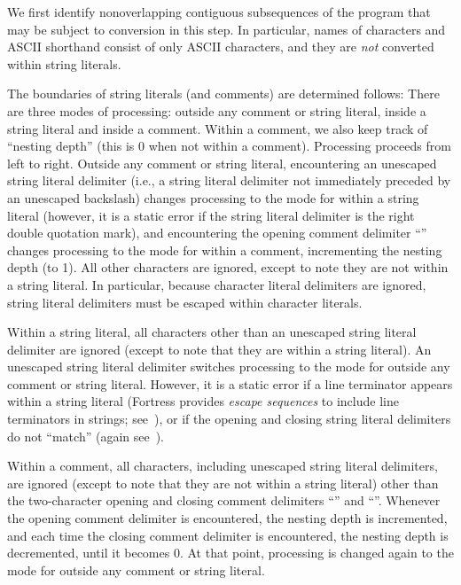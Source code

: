 We first identify nonoverlapping contiguous subsequences
of the program
that may be subject to conversion in this step.
In particular,
names of characters and ASCII shorthand consist of
only ASCII characters,
and they are \emph{not} converted within string literals.

The boundaries of string literals (and comments)
are determined follows:
There are three modes of processing:
outside any comment or string literal,
inside a string literal
and inside a comment.
Within a comment,
we also keep track of ``nesting depth''
(this is 0 when not within a comment).
Processing proceeds from left to right.
Outside any comment or string literal,
encountering an unescaped string literal delimiter
(i.e., a string literal delimiter not immediately
preceded by an unescaped backslash)
changes processing to the mode for within a string literal
(however, it is a static error if the string literal delimiter
is the right double quotation mark),
and encountering
the opening comment delimiter ``\txt{(*}''
changes processing to the mode for within a comment,
incrementing the nesting depth (to 1).
All other characters are ignored,
except to note they are not within a string literal.
In particular,
because character literal delimiters are ignored,
string literal delimiters must be escaped within
character literals.

Within a string literal,
all characters other than an unescaped string literal delimiter
are ignored
(except to note that they are within a string literal).
An unescaped string literal delimiter switches processing
to the mode for outside any comment or string literal.
However,
it is a static error if a line terminator appears
within a string literal
(Fortress provides \emph{escape sequences}
to include line terminators in strings;
see~),
or if the opening and closing string literal delimiters
do not ``match''
(again see~).

Within a comment,
all characters, including unescaped string literal delimiters, are ignored
(except to note that they are not within a string literal)
other than the two-character opening and closing comment delimiters
``\txt{(*}'' and ``\txt{*)}''.
Whenever the opening comment delimiter is encountered,
the nesting depth is incremented,
and each time the closing comment delimiter is encountered,
the nesting depth is decremented,
until it becomes 0.
At that point, processing is changed again to the mode
for outside any comment or string literal.

